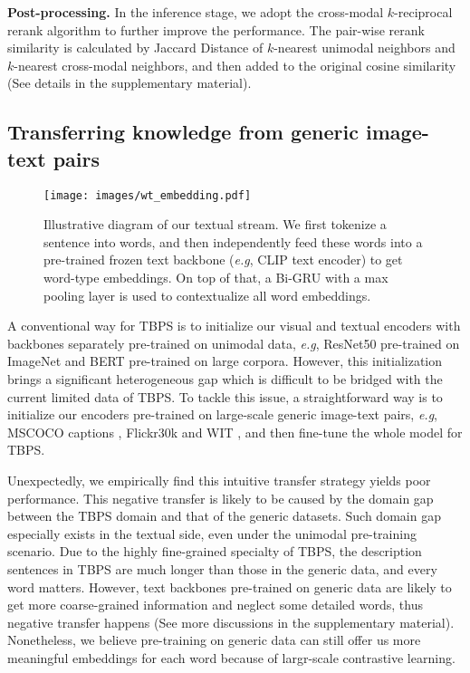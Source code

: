 \documentclass{bmvc2k}
\def\eg{\emph{e.g}\bmvaOneDot}
\newcommand{\revision}[1]{#1}
\newcommand{\statement}[1]{\noindent\textbf{#1}}
\begin{document}
\statement{Post-processing.} In the inference stage, we adopt the cross-modal $k$-reciprocal rerank algorithm \cite{gao2021contextual} to further improve the performance. 
The pair-wise rerank similarity is calculated by Jaccard Distance of $k$-nearest unimodal neighbors and $k$-nearest cross-modal neighbors, and then added to the original cosine similarity (See details in the supplementary material).

\vspace*{-3mm}
\subsection{Transferring knowledge from generic image-text pairs}
\label{transfer}

\begin{figure}[t]
\centering
\texttt{[image: images/wt\_embedding.pdf]}
\caption{\revision{Illustrative diagram of our textual stream. We first tokenize a sentence into words, and then independently feed these words into a pre-trained frozen text backbone (\eg, CLIP text encoder) to get word-type embeddings. On top of that, a Bi-GRU with a max pooling layer is used to contextualize all word embeddings.}}
\label{wt_embedding}
\vspace*{-3mm}
\end{figure}
 A conventional way for TBPS is to initialize our visual and textual encoders with backbones separately pre-trained on unimodal data, \eg, ResNet50 \cite{he2016resnet} pre-trained on ImageNet \cite{deng2009imagenet} and BERT \cite{su2019vlbert} pre-trained on large corpora.
However, this initialization brings a significant heterogeneous gap which is difficult to be bridged with the current limited data of TBPS. 
To tackle this issue, a straightforward way is to initialize our encoders pre-trained on large-scale generic image-text pairs, \eg, MSCOCO captions \cite{lin2014coco}, Flickr30k \cite{plummer2015flickr30k} and WIT \cite{radford2021clip}, and then fine-tune the whole model for TBPS. 

Unexpectedly, we empirically find this intuitive transfer strategy yields poor performance. 
This negative transfer is likely to be caused by the domain gap between the TBPS domain and that of the generic datasets. 
\revision{Such domain gap especially exists in the textual side, even under the unimodal pre-training scenario. Due to the highly fine-grained specialty of TBPS, the description sentences in TBPS are much longer than those in the generic data, and every word matters. However, text backbones pre-trained on generic data are likely to get more coarse-grained information and neglect some detailed words, thus negative transfer happens (See more discussions in the supplementary material). Nonetheless, we believe pre-training on generic data can still offer us more meaningful embeddings for each word because of largr-scale contrastive learning.}
\end{document}
